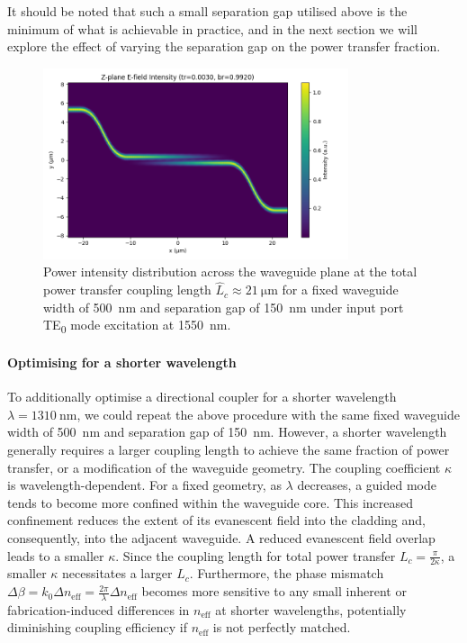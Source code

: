 \documentclass[10pt, a4paper]{article}
\begin{document}
It should be noted that such a small separation gap utilised above is the minimum of what is achievable in practice,
and in the next section we will explore the effect of varying the separation gap on the power transfer fraction.

\begin{figure}[h!]
  \centering
  \includegraphics[width=0.8\textwidth]{task3/sim_2318_110625/z_plane_intensity.png}
  \caption{Power intensity distribution across the waveguide plane at the total power transfer coupling length \(\hat{L}_c\approx\SI{21}{\um}\) for a fixed waveguide width of \SI{500}{\nm} and separation gap of \SI{150}{\nm} under input port TE\textsubscript{0} mode excitation at \SI{1550}{\nm}.}
  \label{fig:max_power_distribution}
\end{figure}

\paragraph{Optimising for a shorter wavelength}
To additionally optimise a directional coupler for a shorter wavelength \(\lambda=\SI{1310}{\nm}\), we could repeat the above procedure with the same fixed waveguide width of \SI{500}{\nm} and separation gap of \SI{150}{\nm}.
However, a shorter wavelength generally requires a larger coupling length to achieve the same fraction of power transfer, or a modification of the waveguide geometry.
The coupling coefficient \(\kappa\) is wavelength-dependent. For a fixed geometry, as \(\lambda\) decreases, a guided mode tends to become more confined within the waveguide core. This increased confinement reduces the extent of its evanescent field into the cladding and, consequently, into the adjacent waveguide. A reduced evanescent field overlap leads to a smaller \(\kappa\). Since the coupling length for total power transfer \(L_c = \frac{\pi}{2\kappa}\), a smaller \(\kappa\) necessitates a larger \(L_c\).
Furthermore, the phase mismatch \(\Delta\beta = k_0 \Delta n_\text{eff} = \frac{2\pi}{\lambda} \Delta n_\text{eff}\) becomes more sensitive to any small inherent or fabrication-induced differences in \(n_\text{eff}\) at shorter wavelengths, potentially diminishing coupling efficiency if \(n_\text{eff}\) is not perfectly matched.
\end{document}
